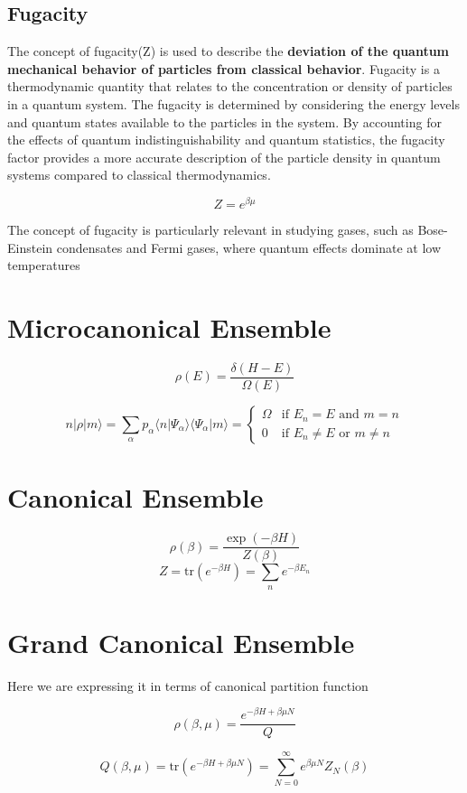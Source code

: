\documentclass{article}
\begin{document}
\subsection{Fugacity}

The concept of fugacity(Z) is used to describe the \textbf{deviation of the quantum mechanical behavior of particles from classical behavior}. Fugacity is a thermodynamic quantity that relates to the concentration or density of particles in a quantum system.
The fugacity is determined by considering the energy levels and quantum states available to the particles in the system. By accounting for the effects of quantum indistinguishability and quantum statistics, the fugacity factor provides a more accurate description of the particle density in quantum systems compared to classical thermodynamics.

$$Z = e^{\beta\mu}$$



The concept of fugacity is particularly relevant in studying gases, such as Bose-Einstein condensates and Fermi gases, where quantum effects dominate at low temperatures



\section{Microcanonical Ensemble}


$$\rho(E) = \frac{\delta(H - E)}{\Omega(E)}$$

$$n|\rho|m⟩ = \sum_\alpha p_\alpha \langle n | \Psi_\alpha \rangle \langle \Psi_\alpha | m \rangle = \begin{cases} \Omega & \text{if } E_n = E \text{ and } m = n\\ 0 & \text{if } E_n \neq E \text{ or } m \neq n \end{cases}$$




\section{Canonical Ensemble}

$$\rho(\beta) = \frac{\exp(-\beta H)}{Z(\beta)}$$
$$Z = \text{tr}(e^{-\beta H}) = \sum_n e^{-\beta E_n}$$



\section{Grand Canonical Ensemble}

Here we are expressing it in terms of canonical partition function

$$\rho(\beta, \mu) = \frac{e^{-\beta H + \beta \mu N}}{Q}$$

$$Q(\beta, \mu) = \text{tr}(e^{-\beta H + \beta \mu N}) = \sum_{N=0}^\infty e^{\beta \mu N} Z_N(\beta)$$
\end{document}
